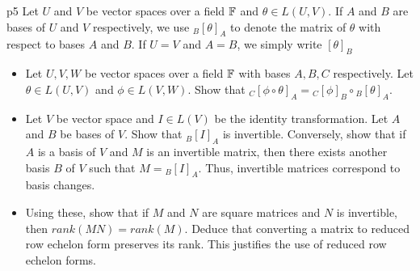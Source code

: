 \documentclass[a4paper, 11pt]{article}
\begin{document}
\begin{problem}{%
}{p5%
}
Let $U$ and $V$ be vector spaces over a field $\mathbb{F}$ and $\theta\in L(U,V)$. If $A$ and $B$ are bases of $U$ and $V$ respectively, we use $_B[\theta]_A$ to denote the matrix of $\theta$ with respect to bases $A$ and $B$. If $U=V$ and $A=B$, we simply write $[\theta]_B$\begin{itemize}[label=$\bullet$]
	\item Let $U,V,W$ be vector spaces over a field $\mathbb{F}$ with bases $A,B,C$ respectively. Let $\theta\in L(U,V)$ and $\phi\in L(V,W)$. Show that $_C[\phi\circ\theta]_A={}_C[\phi]_B\circ {}_B[\theta]_A$.
	\item Let $V$ be vector space and $I\in L(V)$ be the identity transformation. Let $A$ and $B$ be bases of $V$. Show that $_B[I]_A$ is invertible. Conversely, show that if $A$ is a basis of $V$ and $M$ is an invertible matrix, then there exists another basis $B$ of $V$ such that $M={}_B[I]_A$. Thus, invertible matrices correspond to basis changes.
	\item Using these, show that if $M$ and $N$ are square matrices and $N$ is invertible, then $rank(MN)=rank(M)$. Deduce that converting a matrix to reduced row echelon form preserves its rank. This justifies the use of reduced row echelon forms.
\end{itemize}
\end{problem}
\end{document}
